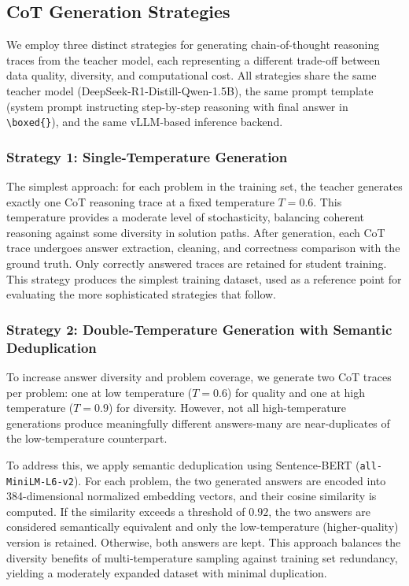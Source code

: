 \documentclass{article}
\begin{document}
\subsection{CoT Generation Strategies}

We employ three distinct strategies for generating chain-of-thought reasoning traces from the teacher model, each representing a different trade-off between data quality, diversity, and computational cost. All strategies share the same teacher model (DeepSeek-R1-Distill-Qwen-1.5B), the same prompt template (system prompt instructing step-by-step reasoning with final answer in \texttt{\textbackslash{}boxed\{\}}), and the same vLLM-based inference backend.

\subsubsection{Strategy 1: Single-Temperature Generation}

The simplest approach: for each problem in the training set, the teacher generates exactly one CoT reasoning trace at a fixed temperature $T = 0.6$. This temperature provides a moderate level of stochasticity, balancing coherent reasoning against some diversity in solution paths. After generation, each CoT trace undergoes answer extraction, cleaning, and correctness comparison with the ground truth. Only correctly answered traces are retained for student training. This strategy produces the simplest training dataset, used as a reference point for evaluating the more sophisticated strategies that follow.

\subsubsection{Strategy 2: Double-Temperature Generation with Semantic Deduplication}

To increase answer diversity and problem coverage, we generate two CoT traces per problem: one at low temperature ($T = 0.6$) for quality and one at high temperature ($T = 0.9$) for diversity. However, not all high-temperature generations produce meaningfully different answers-many are near-duplicates of the low-temperature counterpart.

To address this, we apply semantic deduplication using Sentence-BERT (\texttt{all-MiniLM-L6-v2}). For each problem, the two generated answers are encoded into 384-dimensional normalized embedding vectors, and their cosine similarity is computed. If the similarity exceeds a threshold of $0.92$, the two answers are considered semantically equivalent and only the low-temperature (higher-quality) version is retained. Otherwise, both answers are kept. This approach balances the diversity benefits of multi-temperature sampling against training set redundancy, yielding a moderately expanded dataset with minimal duplication.
\end{document}
